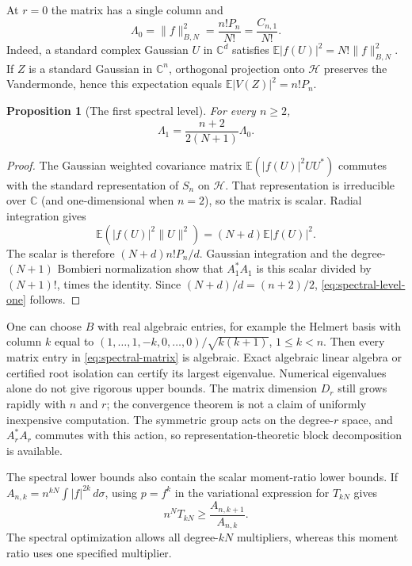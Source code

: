 \documentclass[11pt]{article}
\newtheorem{proposition}[theorem]{Proposition}
\theoremstyle{remark}
\newcommand{\C}{\mathbb C}
\numberwithin{equation}{section}
\begin{document}
At $r=0$ the matrix has a single column and
\begin{equation}\label{eq:spectral-level-zero}
 \Lambda_0=\|f\|_{B,N}^2=\frac{n!P_n}{N!}
             =\frac{C_{n,1}}{N!}.
\end{equation}
Indeed, a standard complex Gaussian $U$ in $\C^d$ satisfies
$\mathbb E|f(U)|^2=N!\|f\|_{B,N}^2$. If $Z$ is a standard Gaussian
in $\C^n$, orthogonal projection onto $\mathcal H$ preserves the
Vandermonde, hence this expectation equals
$\mathbb E|V(Z)|^2=n!P_n$.

\begin{proposition}[The first spectral level]\label{prop:spectral-level-one}
For every $n\ge2$,
\begin{equation}\label{eq:spectral-level-one}
 \Lambda_1=\frac{n+2}{2(N+1)}\Lambda_0.
\end{equation}
\end{proposition}
\begin{proof}
The Gaussian weighted covariance matrix
$\mathbb E(|f(U)|^2UU^*)$ commutes with the standard representation
of $S_n$ on $\mathcal H$. That representation is irreducible over
$\C$ (and one-dimensional when $n=2$), so the matrix is scalar.
Radial integration gives
\[
 \mathbb E(|f(U)|^2\|U\|^2)=(N+d)\mathbb E|f(U)|^2.
\]
The scalar is therefore $(N+d)n!P_n/d$. Gaussian integration and
the degree-$(N+1)$ Bombieri normalization show that $A_1^*A_1$ is
this scalar divided by $(N+1)!$, times the identity. Since
$(N+d)/d=(n+2)/2$, \eqref{eq:spectral-level-one} follows.
\end{proof}

One can choose $B$ with real algebraic entries, for example the
Helmert basis with column $k$ equal to
$(1,\ldots,1,-k,0,\ldots,0)/\sqrt{k(k+1)}$, $1\le k<n$.
Then every matrix entry in \eqref{eq:spectral-matrix} is algebraic.
Exact algebraic linear algebra or certified root isolation can
certify its largest eigenvalue. Numerical eigenvalues alone do not
give rigorous upper bounds. The matrix dimension $D_r$ still grows
rapidly with $n$ and $r$; the convergence theorem is not a claim of
uniformly inexpensive computation. The symmetric group acts on the
degree-$r$ space, and $A_r^*A_r$ commutes with this action, so
representation-theoretic block decomposition is available.

The spectral lower bounds also contain the scalar moment-ratio
lower bounds. If
$A_{n,k}=n^{kN}\int|f|^{2k}\,d\sigma$, using $p=f^k$ in the
variational expression for $T_{kN}$ gives
\[
 n^NT_{kN}\ge\frac{A_{n,k+1}}{A_{n,k}}.
\]
The spectral optimization allows all degree-$kN$ multipliers,
whereas this moment ratio uses one specified multiplier.
\end{document}
